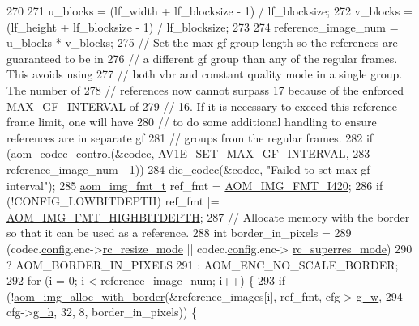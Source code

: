 \begin{DoxyCodeInclude}
{{{{{270 
271   u\_blocks = (lf\_width + lf\_blocksize - 1) / lf\_blocksize;
272   v\_blocks = (lf\_height + lf\_blocksize - 1) / lf\_blocksize;
273 
274   reference\_image\_num = u\_blocks * v\_blocks;
275   \textcolor{comment}{// Set the max gf group length so the references are guaranteed to be in}
276   \textcolor{comment}{// a different gf group than any of the regular frames. This avoids using}
277   \textcolor{comment}{// both vbr and constant quality mode in a single group. The number of}
278   \textcolor{comment}{// references now cannot surpass 17 because of the enforced MAX\_GF\_INTERVAL of}
279   \textcolor{comment}{// 16. If it is necessary to exceed this reference frame limit, one will have}
280   \textcolor{comment}{// to do some additional handling to ensure references are in separate gf}
281   \textcolor{comment}{// groups from the regular frames.}
282   \textcolor{keywordflow}{if} (\hyperlink{group__codec_ga6da974f4eeaba1fa74106b28d0fe6ac5}{aom\_codec\_control}(&codec, \hyperlink{group__aom__encoder_ggae78dde67a6d78f332e9bdba0dde42db5a0355cea227ab76f9bd77028a39bbfca8}{AV1E\_SET\_MAX\_GF\_INTERVAL},
283                         reference\_image\_num - 1))
284     die\_codec(&codec, \textcolor{stringliteral}{"Failed to set max gf interval"});
285   \hyperlink{aom__image_8h_ab71efff8c7f49380fad23b93bc2e9bfc}{aom\_img\_fmt\_t} ref\_fmt = \hyperlink{aom__image_8h_a930317c04b4bd0a660bb5e744055523cabd778a3d697463e89d12a1117f417b60}{AOM\_IMG\_FMT\_I420};
286   \textcolor{keywordflow}{if} (!CONFIG\_LOWBITDEPTH) ref\_fmt |= \hyperlink{aom__image_8h_a607b37d91f75442f54223ecd85f1b6cb}{AOM\_IMG\_FMT\_HIGHBITDEPTH};
287   \textcolor{comment}{// Allocate memory with the border so that it can be used as a reference.}
288   \textcolor{keywordtype}{int} border\_in\_pixels =
289       (codec.\hyperlink{structaom__codec__ctx_ac6777025d3b72c9ab49adba78fc70b30}{config}.enc->\hyperlink{structaom__codec__enc__cfg_ab9123d944cd168511d65c823b30d5705}{rc\_resize\_mode} || codec.\hyperlink{structaom__codec__ctx_ac6777025d3b72c9ab49adba78fc70b30}{config}.enc->
      \hyperlink{structaom__codec__enc__cfg_a704ff1b4202b1d5499928b98eef17424}{rc\_superres\_mode})
290           ? AOM\_BORDER\_IN\_PIXELS
291           : AOM\_ENC\_NO\_SCALE\_BORDER;
292   \textcolor{keywordflow}{for} (i = 0; i < reference\_image\_num; i++) \{
293     \textcolor{keywordflow}{if} (!\hyperlink{aom__image_8h_aeb211e5184687f7e10d7c5bed4dcfdcd}{aom\_img\_alloc\_with\_border}(&reference\_images[i], ref\_fmt, cfg->
      \hyperlink{structaom__codec__enc__cfg_a80cb459c5ef3c7e1516f617c4c9d6eab}{g\_w},
294                                    cfg->\hyperlink{structaom__codec__enc__cfg_a37b0f57b63bec8d133df8901d4407ee6}{g\_h}, 32, 8, border\_in\_pixels)) \{
}}}}}
\end{DoxyCodeInclude}
